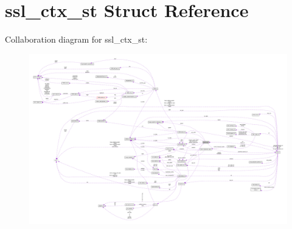 \hypertarget{structssl__ctx__st}{}\section{ssl\+\_\+ctx\+\_\+st Struct Reference}
\label{structssl__ctx__st}


Collaboration diagram for ssl\+\_\+ctx\+\_\+st\+:
\nopagebreak
\begin{figure}[H]
\begin{center}
\leavevmode
\includegraphics[width=350pt]{structssl__ctx__st__coll__graph}
\end{center}
\end{figure}
